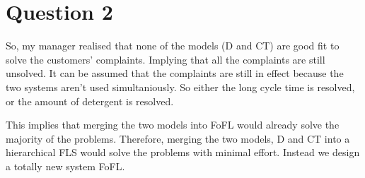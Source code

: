 \documentclass[11pt]{article}
\begin{document}

\section*{Question 2}

So, my manager realised that none of the models (D and CT) are good fit to solve
the customers' complaints. Implying that all the complaints are still unsolved.
It can be assumed that the complaints are still in effect because the
two systems aren't used simultaniously. So either the long cycle time is
resolved, or the amount of detergent is resolved.

This implies that merging the two models into FoFL would already solve the
majority of the problems. Therefore, merging the two models, D and CT into a
hierarchical FLS would solve the problems with minimal effort. Instead we
design a totally new system FoFL.
\end{document}
